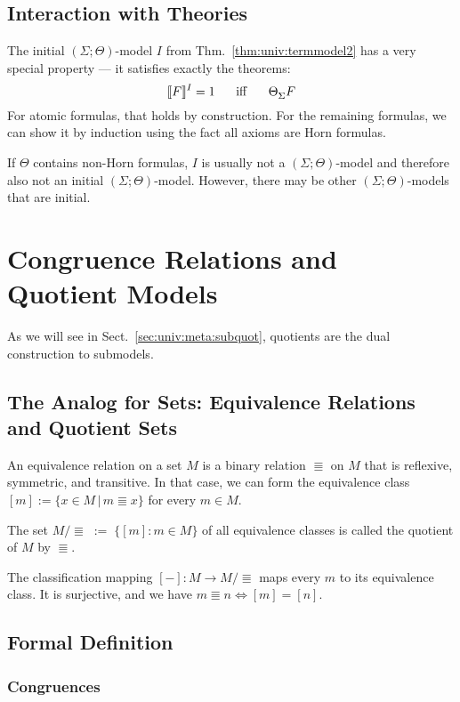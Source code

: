 \subsection{Interaction with Theories}

The initial $(\Sigma;\Theta)$-model $I$ from Thm.~\ref{thm:univ:termmodel2} has a very special property --- it satisfies exactly the theorems:
\[\semm{F}{I}=1\tb\miff\tb \iscons{\Sigma}{}{\Theta}{F}\]
For atomic formulas, that holds by construction.
For the remaining formulas, we can show it by induction using the fact all axioms are Horn formulas.

If $\Theta$ contains non-Horn formulas, $I$ is usually not a $(\Sigma;\Theta)$-model and therefore also not an initial $(\Sigma;\Theta)$-model.
However, there may be other $(\Sigma;\Theta)$-models that are initial.

\section{Congruence Relations and Quotient Models}\label{sec:univ:quot}

As we will see in Sect.~\ref{sec:univ:meta:subquot}, quotients are the dual construction to submodels.

\subsection{The Analog for Sets: Equivalence Relations and Quotient Sets}

An equivalence relation on a set $M$ is a binary relation $\Equiv$ on $M$ that is reflexive, symmetric, and transitive.
In that case, we can form the equivalence class $[m]:=\{x\in M\,|\,m\Equiv x\}$ for every $m\in M$.

The set $M/\Equiv\;:=\;\{[m]:m\in M\}$ of all equivalence classes is called the quotient of $M$ by $\Equiv$.

The classification mapping $[-]:M\to M/\Equiv$ maps every $m$ to its equivalence class.
It is surjective, and we have $m\Equiv n\iff [m]=[n]$.

\subsection{Formal Definition}

\subsubsection{Congruences}

